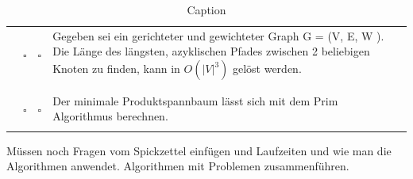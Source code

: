 \documentclass{article}
\begin{document}
\begin{table}[]
\begin{tabular}{ | p{1cm} | c c | p{13cm} |}
      \cite{hauptklausur21}  & $\square$ &  $\square$  & Gegeben sei ein gerichteter und gewichteter Graph G = (V, E, W ). Die Länge des längsten, azyklischen Pfades zwischen 2 beliebigen Knoten zu finden, kann in $O(|V|^3)$ gelöst werden.  \\ & & & \\
        \hline \hline & & & \\
    \cite{nachklausur19}    & $\square$ &  $\square$  & Der minimale Produktspannbaum lässt sich mit dem Prim Algorithmus berechnen. \\ & & & \\ \hline
    \end{tabular}
    \caption{Caption}
    \label{tab:my_label}
\end{table}


Müssen noch Fragen vom Spickzettel einfügen und Laufzeiten und wie man die Algorithmen anwendet. Algorithmen mit Problemen zusammenführen. 



\printindex
{}
\listofalgorithms

\printbibliography
\end{document}
